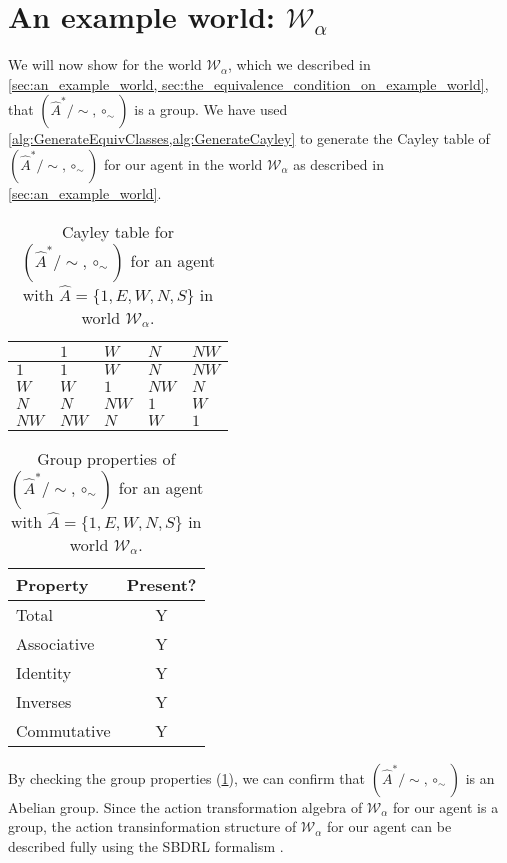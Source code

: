 \section{
An example world\texorpdfstring{: $\mathscr{W}_{\alpha}$}{}
}

We will now show for the world $\mathscr{W}_{\alpha}$, which we described in \cref{sec:an_example_world, sec:the_equivalence_condition_on_example_world}, that $(\hat{A}^{*}/\sim, \circ_{\sim})$ is a group.
We have used \cref{alg:GenerateEquivClasses,alg:GenerateCayley} to generate the Cayley table of $(\hat{A}^{*}/\sim, \circ_{\sim})$ for our agent in the world $\mathscr{W}_{\alpha}$ as described in \cref{sec:an_example_world}.

\begin{table}[H]
\centering
\begin{tabular}{l| llll}
     & $1$ & $W$  & $N$  & $NW$ \\
    \hline
    $1$ & $1$ & $W$  & $N$  & $NW$ \\
    $W$ & $W$ & $1$  & $NW$ & $N$  \\
    $N$ & $N$ & $NW$ & $1$  & $W$  \\
    $NW$ & $NW$ & $N$ & $W$  & $1$  \\
\end{tabular}
\caption{
Cayley table for $(\hat{A}^{*}/\sim, \circ_{\sim})$ for an agent with $\hat{A} = \{1, E, W, N, S \}$ in world $\mathscr{W}_{\alpha}$.
}
\end{table}

\begin{table}[H]
\centering
\begin{tabular}{l|c}
\textbf{Property} & \textbf{Present?} \\
\hline
Total & Y \\
Associative & Y \\
Identity & Y \\
Inverses & Y \\
\hline
Commutative & Y \\
\end{tabular}
\caption{
Group properties of $(\hat{A}^{*}/\sim, \circ_{\sim})$ for an agent with $\hat{A} = \{1, E, W, N, S \}$ in world $\mathscr{W}_{\alpha}$.
}
\label{tab:example_1_group_properties}
\end{table}

By checking the group properties (\cref{tab:example_1_group_properties}), we can confirm that $(\hat{A}^{*}/\sim, \circ_{\sim})$ is an Abelian group.
Since the action transformation algebra of $\mathscr{W}_{\alpha}$ for our agent is a group, the action transinformation structure of $\mathscr{W}_{\alpha}$ for our agent can be described fully using the SBDRL formalism .


